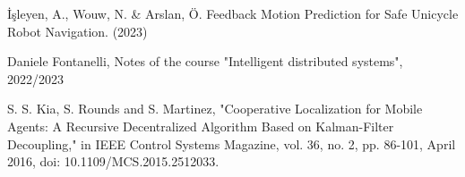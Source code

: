 \begin{thebibliography}{00}
 İşleyen, A., Wouw, N. \& Arslan, Ö. Feedback Motion Prediction for Safe Unicycle Robot Navigation.  (2023)

 Daniele Fontanelli,
Notes of the course "Intelligent distributed systems",
2022/2023

 S. S. Kia, S. Rounds and S. Martinez, "Cooperative Localization for Mobile Agents: A Recursive Decentralized Algorithm Based on Kalman-Filter Decoupling," in IEEE Control Systems Magazine, vol. 36, no. 2, pp. 86-101, April 2016, doi: 10.1109/MCS.2015.2512033.
\end{thebibliography}
